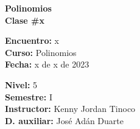 \begin{center} \textbf
{
    \Large Polinomios \\ \vspace{2mm}Clase \#x
}
\end{center}

\begin{multicols}{2}
{
    \textbf{Encuentro:} x\\
    \textbf{Curso:} Polinomios\\
    \textbf{Fecha:} x de x de 2023\\
    \begin{flushright}
        \textbf{Nivel:} 5\\
        \textbf{Semestre:} I\\
        \textbf{Instructor:} Kenny Jordan Tinoco\\
        \textbf{D. auxiliar: }José Adán Duarte
    \end{flushright}
}
\end{multicols}

\thispagestyle{first-page-style}